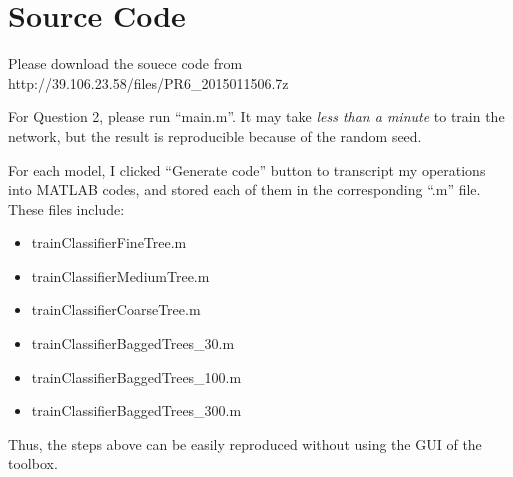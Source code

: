 \documentclass{article}
\begin{document}
\section*{Source Code}
{
    Please download the souece code from http://39.106.23.58/files/PR6\_2015011506.7z

    For Question 2, please run ``main.m''. It may take \emph{less than a minute} to train the network, but the result is reproducible because of the random seed.

    For each model, I clicked ``Generate code'' button to transcript my operations into MATLAB codes, and stored each of them in the corresponding ``.m'' file. These files include:
    \begin{itemize}
        \item trainClassifierFineTree.m
        \item trainClassifierMediumTree.m
        \item trainClassifierCoarseTree.m
        \item trainClassifierBaggedTrees\_30.m
        \item trainClassifierBaggedTrees\_100.m
        \item trainClassifierBaggedTrees\_300.m
    \end{itemize}
    Thus, the steps above can be easily reproduced without using the GUI of the toolbox. 

}

\clearpage
\end{document}
